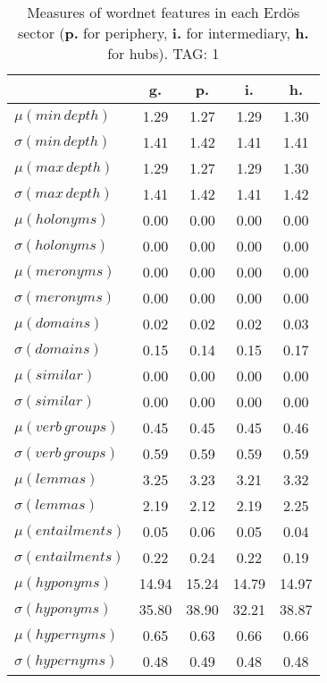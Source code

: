 \begin{table}[h!]
\begin{center}
\begin{tabular}{| l || c | c | c | c |}\hline
 & {\bf g.} & {\bf p.} & {\bf i.} & {\bf h.} \\\hline\hline
$\mu(min\,depth)$ & 1.29  & 1.27  & 1.29  & 1.30 \\
$\sigma(min\,depth)$ & 1.41  & 1.42  & 1.41  & 1.41 \\\hline
$\mu(max\,depth)$ & 1.29  & 1.27  & 1.29  & 1.30 \\
$\sigma(max\,depth)$ & 1.41  & 1.42  & 1.41  & 1.42 \\\hline
$\mu(holonyms)$ & 0.00  & 0.00  & 0.00  & 0.00 \\
$\sigma(holonyms)$ & 0.00  & 0.00  & 0.00  & 0.00 \\\hline
$\mu(meronyms)$ & 0.00  & 0.00  & 0.00  & 0.00 \\
$\sigma(meronyms)$ & 0.00  & 0.00  & 0.00  & 0.00 \\\hline
$\mu(domains)$ & 0.02  & 0.02  & 0.02  & 0.03 \\
$\sigma(domains)$ & 0.15  & 0.14  & 0.15  & 0.17 \\\hline
$\mu(similar)$ & 0.00  & 0.00  & 0.00  & 0.00 \\
$\sigma(similar)$ & 0.00  & 0.00  & 0.00  & 0.00 \\\hline
$\mu(verb\,groups)$ & 0.45  & 0.45  & 0.45  & 0.46 \\
$\sigma(verb\,groups)$ & 0.59  & 0.59  & 0.59  & 0.59 \\\hline
$\mu(lemmas)$ & 3.25  & 3.23  & 3.21  & 3.32 \\
$\sigma(lemmas)$ & 2.19  & 2.12  & 2.19  & 2.25 \\\hline
$\mu(entailments)$ & 0.05  & 0.06  & 0.05  & 0.04 \\
$\sigma(entailments)$ & 0.22  & 0.24  & 0.22  & 0.19 \\\hline
$\mu(hyponyms)$ & 14.94  & 15.24  & 14.79  & 14.97 \\
$\sigma(hyponyms)$ & 35.80  & 38.90  & 32.21  & 38.87 \\\hline
$\mu(hypernyms)$ & 0.65  & 0.63  & 0.66  & 0.66 \\
$\sigma(hypernyms)$ & 0.48  & 0.49  & 0.48  & 0.48 \\\hline
\end{tabular}
\caption{Measures of wordnet features in each Erd\"os sector ({{\bf p.}} for periphery, {{\bf i.}} for intermediary, {{\bf h.}} for hubs). TAG: 1}
\end{center}
\end{table}